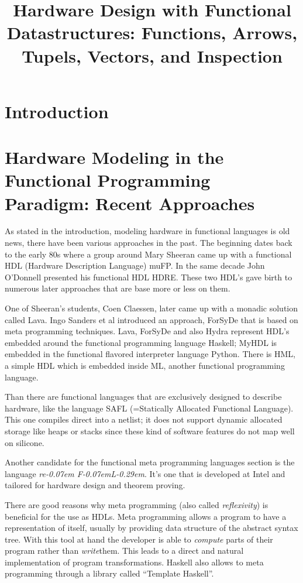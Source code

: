 \documentclass[11pt,final,a4paper]{article}
\title{Hardware Design with Functional Datastructures: Functions, Arrows, Tupels, Vectors, and Inspection}
\newcommand{\reFLect}{\textit{re\kern-0.07em F\kern-0.07emL\kern-0.29em\raisebox{0.56ex}{ect}}}
\begin{document}
\section{Introduction}

\section{Hardware Modeling in the Functional Programming Paradigm: Recent Approaches}
\label{recent_approaches}
As stated in the introduction, modeling hardware in functional languages is old news, there have been various approaches in the
past. The beginning dates back to the early 80s where a group around Mary Sheeran came up with a functional HDL (Hardware
Description Language) muFP\cite{sheeran:muFP}. In the same decade John O'Donnell presented his functional HDL
HDRE\cite{hydra:old,donnell}. These two HDL's gave birth to numerous later approaches that are base more or less on them.

One of Sheeran's students, Coen Claessen, later came up with a monadic solution called Lava\cite{claessen:hardware}. Ingo Sanders
et al introduced an approach, ForSyDe \cite{forsyde:phd,forsyde:ieee} that is based on meta programming techniques. Lava, ForSyDe
and also Hydra %
represent HDL's embedded around the functional programming language Haskell; MyHDL \cite{myhdl} is embedded in the functional
flavored interpreter language Python. There is HML\cite{hml}, a simple HDL which is embedded inside ML, another functional
programming language.

Than there are functional languages that are exclusively designed to describe hardware, like the language SAFL (=Statically
Allocated Functional Language)\cite{sharp,sharp:flash,sharp:codesign}. This one compiles direct into a netlist; it does not
support dynamic allocated storage like heaps or stacks since these kind of software features do not map well on silicone.

Another candidate for the functional meta programming languages section is the language \reFLect \cite{reflect}. It's one that is
developed at Intel and tailored for hardware design and theorem proving.

There are good reasons why meta programming (also called \emph{reflexivity}) is beneficial for the use as HDLs. Meta programming
allows a program to have a representation of itself, usually by providing data structure of the abstract syntax tree. With this
tool at hand the developer is able to \emph{compute} parts of their program rather than \emph{write}them. This leads to a direct
and natural implementation of program transformations. Haskell also allows to meta programming through a library called ``Template
Haskell''\cite{haskell:template}. 
\end{document}
